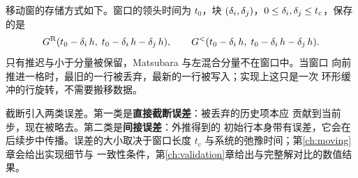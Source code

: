 移动窗的存储方式如下。窗口的领头时间为 $t_0$，块
$(\delta_i,\delta_j)$，$0\le\delta_i,\delta_j\le t_c$，保存的是
\begin{equation}
    G^{\mathrm{R}}(t_0-\delta_i\,h,\; t_0-\delta_i\,h-\delta_j\,h),
    \qquad
    G^{<}(t_0-\delta_i\,h,\; t_0-\delta_i\,h-\delta_j\,h).
    \label{eq:window}
\end{equation}
只有推迟与小于分量被保留，Matsubara 与左混合分量不在窗口中。当窗口
向前推进一格时，最旧的一行被丢弃，最新的一行被写入；实现上这只是一次
环形缓冲的行旋转，不需要搬移数据。

截断引入两类误差。第一类是\textbf{直接截断误差}：被丢弃的历史项本应
贡献到当前步，现在被略去。第二类是\textbf{间接误差}：外推得到的
初始行本身带有误差，它会在后续步中传播。误差的大小取决于窗口长度
$t_c$ 与系统的弛豫时间；第\ref{ch:moving}章会给出实现细节与
一致性条件，第\ref{ch:validation}章给出与完整解对比的数值结果。
